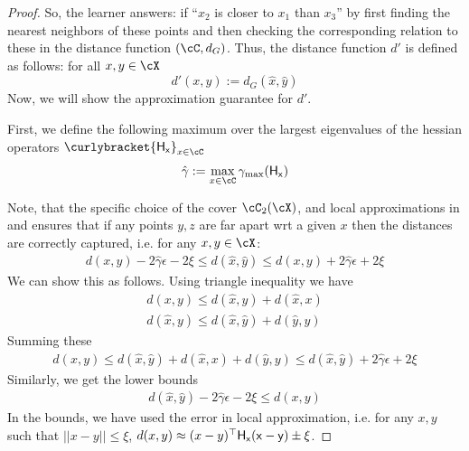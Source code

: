 \begin{proof}
     So, the learner answers: if ``$x_2$ is closer to $x_1$ than $x_3$'' by first finding the nearest neighbors of these points and then checking the corresponding relation to these in the distance function $(\cC, d_G)$. %
     Thus, the distance function $d'$ is defined as follows: for all $x,y \in \cX$
     \begin{equation}
         d'(x,y) := d_G(\hat{x}, \hat{y})
     \end{equation}
    Now, we will show the approximation guarantee for $d'$.
    
    First, we define the following maximum over the largest eigenvalues of the hessian operators $\curlybracket{\sf{H}_x}_{x \in \cC}$
\begin{align*}
    \hat{\gamma} := \max_{x \in \cC} \gamma_{\max}(\sf{H}_x)
\end{align*}
    
    Note, that the specific choice of the cover $\cC_2(\cX)$, and local approximations in  and 
    ensures that if any points $y,z$ are far apart wrt a given $x$ then the distances are correctly captured, i.e. for any $x,y \in \cX$:
    \begin{align}
        d(x,y) - 2\hat{\gamma}\epsilon - 2\xi \le d(\hat{x}, \hat{y}) \le  d(x,y) + 2\hat{\gamma}\epsilon + 2\xi \label{eq: apdist}
    \end{align}
    We can show this as follows. Using triangle inequality we have
    \begin{align*}
        d(x,y) \le d(\hat{x},y) + d(\hat{x},x)\\
        d(\hat{x},y) \le d(\hat{x},\hat{y}) + d(\hat{y},y)
    \end{align*}
    Summing these 
    \begin{align}
        d(x,y) \le d(\hat{x},\hat{y}) + d(\hat{x},x) + d(\hat{y},y) \le d(\hat{x},\hat{y}) + 2\hat{\gamma}\epsilon + 2\xi
    \end{align}
    Similarly, we get the lower bounds
    \begin{align*}
       d(\hat{x},\hat{y}) - 2\hat{\gamma}\epsilon - 2\xi \le d(x,y)
    \end{align*}
    In the bounds, we have used the error in local approximation, i.e. for any $x,y$ such that $||x-y|| \le \xi$, $d(x,y) \approx (x-y)^{\top}\sf{H}_x(x-y) \pm \xi$.
    

\end{proof}
